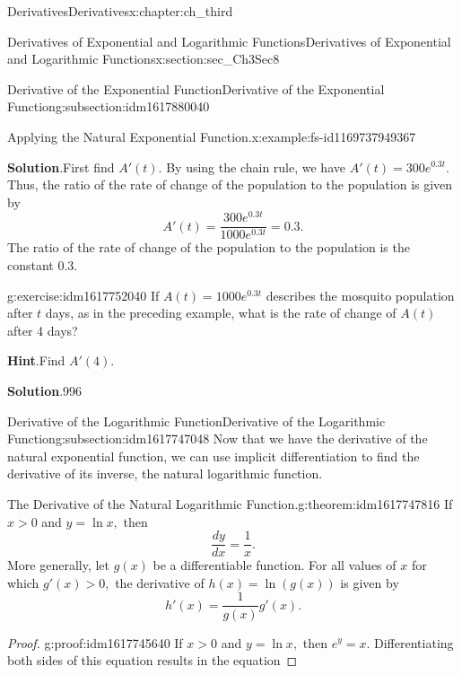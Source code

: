 \documentclass[oneside,10pt,]{book}
\newcommand{\blocktitlefont}{\relax}
\numberwithin{equation}{section}
\newcommand{\gt}{>}
\begin{document}
\begin{chapterptx}{Derivatives}{}{Derivatives}{}{}{x:chapter:ch_third}
\begin{sectionptx}{Derivatives of Exponential and Logarithmic Functions}{}{Derivatives of Exponential and Logarithmic Functions}{}{}{x:section:sec_Ch3Sec8}
\begin{subsectionptx}{Derivative of the Exponential Function}{}{Derivative of the Exponential Function}{}{}{g:subsection:idm1617880040}
\begin{example}{Applying the Natural Exponential Function.}{x:example:fs-id1169737949367}
\par\smallskip%
\noindent\textbf{\blocktitlefont Solution}.\hypertarget{g:solution:idm1617756392}{}\quad{}First find \(A'(t).\) By using the chain rule, we have \(A'(t)=300e^{0.3t}.\) Thus, the ratio of the rate of change of the population to the population is given by%
%
\begin{equation*}
A'(t)=\frac{300e^{0.3t}}{1000e^{0.3t}}=0.3.
\end{equation*}
The ratio of the rate of change of the population to the population is the constant 0.3.%
\end{example}
\begin{inlineexercise}{}{g:exercise:idm1617752040}%
If \(A(t)=1000e^{0.3t}\) describes the mosquito population after \(t\) days, as in the preceding example, what is the rate of change of \(A(t)\) after 4 days?%
\par\smallskip%
\noindent\textbf{\blocktitlefont Hint}.\hypertarget{g:hint:idm1617753064}{}\quad{}Find \(A'(4).\)%
\par\smallskip%
\noindent\textbf{\blocktitlefont Solution}.\hypertarget{g:solution:idm1617752808}{}\quad{}996%
\end{inlineexercise}%
\end{subsectionptx}
%
%
\typeout{************************************************}
\typeout{************************************************}
%
\begin{subsectionptx}{Derivative of the Logarithmic Function}{}{Derivative of the Logarithmic Function}{}{}{g:subsection:idm1617747048}
Now that we have the derivative of the natural exponential function, we can use implicit differentiation to find the derivative of its inverse, the natural logarithmic function.%
\begin{theorem}{The Derivative of the Natural Logarithmic Function.}{}{g:theorem:idm1617747816}%
If \(x\gt 0\) and \(y=\ln  x,\) then%
%
\begin{equation*}
\frac{dy}{dx}=\frac{1}{x}.
\end{equation*}
More generally, let \(g(x)\) be a differentiable function. For all values of \(x\) for which \(g'(x)\gt 0,\) the derivative of \(h(x)=\ln  (g(x))\) is given by%
%
\begin{equation*}
h'(x)=\frac{1}{g(x)}g'(x).
\end{equation*}
\end{theorem}
\begin{proof}{}{g:proof:idm1617745640}
If \(x\gt 0\) and \(y=\ln  x,\) then \(e^y=x.\) Differentiating both sides of this equation results in the equation%

\end{proof}
\end{subsectionptx}
\end{sectionptx}
\end{chapterptx}
\end{document}
